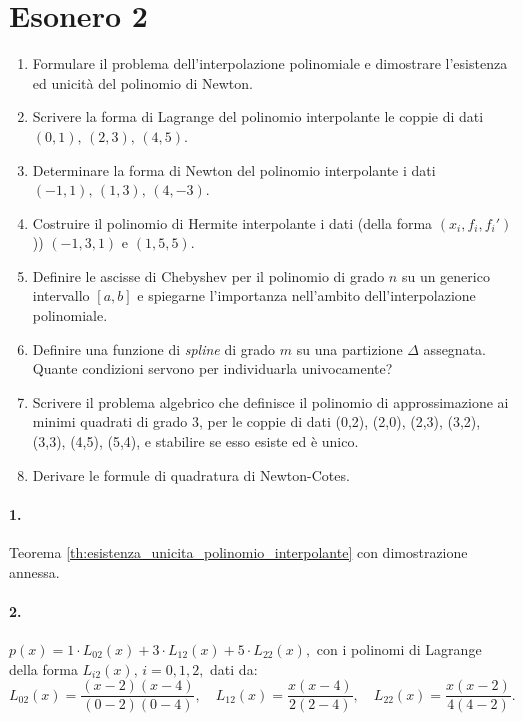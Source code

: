 \section{Esonero 2}
\begin{enumerate}
    \item Formulare il problema dell'interpolazione polinomiale e dimostrare l'esistenza ed unicità del polinomio di Newton.
    \item Scrivere la forma di Lagrange del polinomio interpolante le coppie di dati $(0,1),\, (2,3),\, (4,5)$.
    \item Determinare la forma di Newton del polinomio interpolante i dati $(-1, 1),\, (1, 3),\, (4, -3)$.
    \item Costruire il polinomio di Hermite interpolante i dati (della forma $(x_i, f_i, f_i')$)) $(-1, 3, 1)$ e $(1, 5, 5)$.
    \item Definire le ascisse di Chebyshev per il polinomio di grado $n$ su un generico intervallo $[a,b]$ e spiegarne l'importanza nell'ambito dell'interpolazione polinomiale.
    \item Definire una funzione di \textit{spline} di grado $m$ su una partizione $\Delta$ assegnata. Quante condizioni servono per individuarla univocamente?
    \item Scrivere il problema algebrico che definisce il polinomio di approssimazione ai minimi quadrati di grado 3, per le coppie di dati (0,2), (2,0), (2,3), (3,2), (3,3), (4,5), (5,4), e stabilire se esso esiste ed è unico.
    \item Derivare le formule di quadratura di Newton-Cotes.
\end{enumerate}

\paragraph{1.} Teorema \ref{th:esistenza_unicita_polinomio_interpolante} con dimostrazione annessa.

\paragraph{2.} $p(x)= 1\cdot L_{02}(x)+3\cdot L_{12}(x)+5 \cdot L_{22}(x),$ con i polinomi di Lagrange della forma $L_{i2}(x),\, i=0,1,2,$ dati da:
\begin{equation*}
    L_{02}(x) = \frac{(x-2)(x-4)}{(0-2)(0-4)},\quad L_{12}(x)=\frac{x(x-4)}{2(2-4)},\quad L_{22}(x)=\frac{x(x-2)}{4(4-2)}.
\end{equation*}


